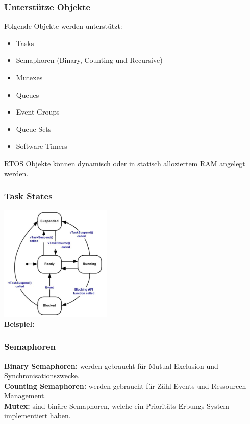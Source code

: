 \subsubsection{Unterstütze Objekte}
Folgende Objekte werden unterstützt:
\begin{multicols}{2}
    \begin{itemize}
        \item Tasks
        \item Semaphoren (Binary, Counting und Recursive)
        \item Mutexes
        \item Queues
        \item Event Groups
        \item Queue Sets
        \item Software Timers
    \end{itemize}
\end{multicols}
RTOS Objekte können dynamisch oder in statisch alloziertem RAM angelegt werden.

\subsubsection{Task States}
\includegraphics[width=0.4\textwidth]{images/Betriebssysteme/freertos_taskstates.png}\\
\textbf{Beispiel:}


\subsubsection{Semaphoren}
\textbf{Binary Semaphoren:} werden gebraucht für Mutual Exclusion und Synchronisationszwecke. \\
\textbf{Counting Semaphoren:} werden gebraucht für Zähl Events und Ressourcen Management. \\
\textbf{Mutex:} sind binäre Semaphoren, welche ein Prioritäts-Erbungs-System implementiert haben.


